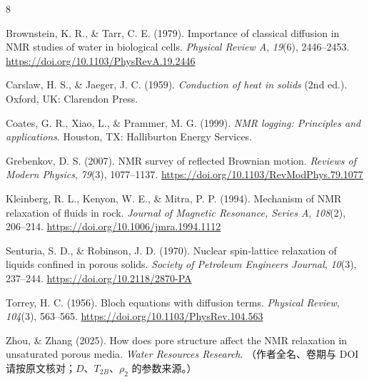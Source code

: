 \documentclass[11pt,a4paper]{article}
\newcommand{\TB}{T_{2B}}
\begin{document}
\begin{thebibliography}{8}
\setlength{\itemsep}{2pt}

Brownstein, K. R., \& Tarr, C. E. (1979). Importance of classical diffusion in NMR studies of water in biological cells.
\emph{Physical Review A}, \emph{19}(6), 2446--2453. \url{https://doi.org/10.1103/PhysRevA.19.2446}

Carslaw, H. S., \& Jaeger, J. C. (1959). \emph{Conduction of heat in solids} (2nd ed.). Oxford, UK: Clarendon Press.

Coates, G. R., Xiao, L., \& Prammer, M. G. (1999). \emph{NMR logging: Principles and applications}.
Houston, TX: Halliburton Energy Services.

Grebenkov, D. S. (2007). NMR survey of reflected Brownian motion. \emph{Reviews of Modern Physics}, \emph{79}(3), 1077--1137.
\url{https://doi.org/10.1103/RevModPhys.79.1077}

Kleinberg, R. L., Kenyon, W. E., \& Mitra, P. P. (1994). Mechanism of NMR relaxation of fluids in rock.
\emph{Journal of Magnetic Resonance, Series A}, \emph{108}(2), 206--214. \url{https://doi.org/10.1006/jmra.1994.1112}

Senturia, S. D., \& Robinson, J. D. (1970). Nuclear spin-lattice relaxation of liquids confined in porous solids.
\emph{Society of Petroleum Engineers Journal}, \emph{10}(3), 237--244. \url{https://doi.org/10.2118/2870-PA}

Torrey, H. C. (1956). Bloch equations with diffusion terms. \emph{Physical Review}, \emph{104}(3), 563--565.
\url{https://doi.org/10.1103/PhysRev.104.563}

Zhou, \& Zhang (2025). How does pore structure affect the NMR relaxation in unsaturated porous media.
\emph{Water Resources Research}. （作者全名、卷期与 DOI 请按原文核对；$D$、$\TB$、$\rho_2$ 的参数来源。）
\end{thebibliography}
\end{document}
